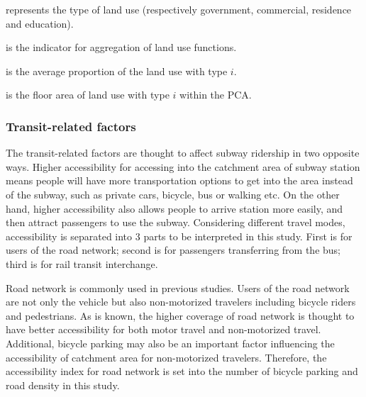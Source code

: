 \begin{description}
	\setlength{\parskip}{0\baselineskip} %
	\normalsize
	\item[\textbf{Where:}]
	\item[$i$] represents the type of land use (respectively government, commercial, residence and education).
	\item[$A$] is the indicator for aggregation of land use functions.
	\item[$P_i$] is the average proportion of the land use with type $i$.
	\item[$L_i$] is the floor area of land use with type $i$ within the PCA.
	\setlength{\parskip}{0.7\baselineskip} %
\end{description}

\subsubsection{Transit-related factors}
%
The transit-related factors are thought to affect subway ridership in two opposite ways. Higher accessibility for accessing into the catchment area of subway station means people will have more transportation options to get into the area instead of the subway, such as private cars, bicycle, bus or walking etc. On the other hand, higher accessibility also allows people to arrive station more easily, and then attract passengers to use the subway. Considering different travel modes, accessibility is separated into 3 parts to be interpreted in this study. First is for users of the road network; second is for passengers transferring from the bus; third is for rail transit interchange.

%
Road network is commonly used in previous studies. Users of the road network are not only the vehicle but also non-motorized travelers including bicycle riders and pedestrians. As is known, the higher coverage of road network is thought to have better accessibility for both motor travel and non-motorized travel. Additional, bicycle parking may also be an important factor influencing the accessibility of catchment area for non-motorized travelers. Therefore, the accessibility index for road network is set into the number of bicycle parking and road density in this study.

